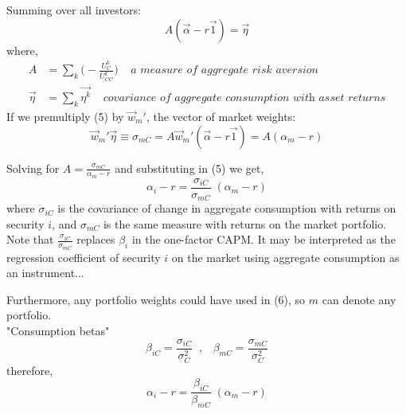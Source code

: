 \documentclass[
14pt,notheorems,hyperref={pdfauthor=whatever}
]{beamer}
\begin{document}
\begin{frame}
Summing over all investors:
\begin{equation} \tag{5}
    A(\vec\alpha-r\vec1) = \vec\eta
\end{equation}
where,
\begin{align*}
    A &= \sum_k \bigg( -\frac{U_C^k}{U_{CC}^k}\bigg) \;\;\;\; \textit{a measure of aggregate risk aversion}\\
    \vec{\eta} &= \sum_k \vec{\eta^k} \;\;\;\; \textit{covariance of aggregate consumption with asset returns}
\end{align*}
If we premultiply (5) by $\vec{w}_m'$, the vector of market weights:\\
\begin{equation} \tag{6}
    \vec{w}_m' \vec{\eta} \equiv \sigma_{mC} = A \vec{w}_m' (\vec\alpha-r\vec1) = A(\alpha_m-r)
\end{equation}
\end{frame}

\begin{frame}
Solving for $A = \frac{\sigma_{mC}}{\alpha_m-r}$ and substituting in (5) we get,\\
\begin{equation} \tag{7}
    \alpha_i-r = \frac{\sigma_{iC}}{\sigma_{mC}}\;(\alpha_m-r)
\end{equation}
where $\sigma_{iC}$ is the covariance of change in aggregate consumption with returns on security $i$, and $\sigma_{mC}$ is the same measure with returns on the market portfolio.\\
\hfill\break
Note that $\frac{\sigma_{iC}}{\sigma_{mC}}$ replaces $\beta_i$ in the one-factor CAPM. It may be interpreted as the regression coefficient of security $i$ on the market using aggregate consumption as an instrument...\\
\end{frame}

\begin{frame}
Furthermore, any portfolio weights could have used in (6), so $m$ can denote any portfolio.\\
\hfill\break
"Consumption betas"
\[ \beta_{iC} = \frac{\sigma_{iC}}{\sigma_C^2} \;\;,\;\;\; \beta_{mC} = \frac{\sigma_{mC}}{\sigma_C^2}\]
therefore,
\[ \alpha_i-r = \frac{\beta_{iC}}{\beta_{mC}}\;(\alpha_m-r)\]
\end{frame}

\end{document}
